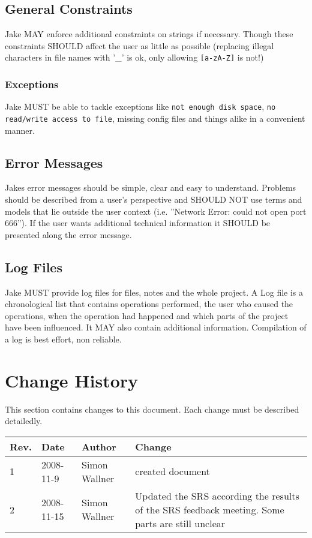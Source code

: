 \subsection{General Constraints}
Jake MAY enforce additional constraints on strings if necessary. Though these constraints SHOULD affect the user as little as possible (replacing illegal characters in file names with '\_' is ok, only allowing \texttt{[a-zA-Z]} is not!)

\subsubsection{Exceptions}
Jake  MUST be able to tackle exceptions like \texttt{not enough disk space}, \texttt{no read/write access to file}, missing config files and things alike in a convenient manner. 

\subsection{Error Messages}
Jakes error messages should be simple, clear and easy to understand. Problems should be described from a user's perspective and SHOULD NOT use terms and models that lie outside the user context (i.e. ''Network Error: could not open port 666''). If the user wants additional technical information it SHOULD be presented along the error message. 

\subsection{Log Files}
Jake MUST provide log files for files, notes and the whole project. A Log file is a chronological list that contains operations performed, the user who caused the operations, when the operation had happened and which parts of the project have been influenced. It MAY also contain additional information. Compilation of a log is best effort, non reliable.

\section{Change History}
This section contains changes to this document. Each change must be described detailedly.
\begin{table}[h]
\begin{tabular}{|l|l|l|l|}
\hline
\textbf{Rev.} & \textbf{Date} & \textbf{Author} & \textbf{Change} \\
\hline
1 & 2008-11-9 & Simon Wallner & created document \\
\hline
2 & 2008-11-15 & Simon Wallner & Updated the SRS according the results of the SRS feedback meeting. Some parts are still unclear \\
\hline
\end{tabular}
\end{table}





